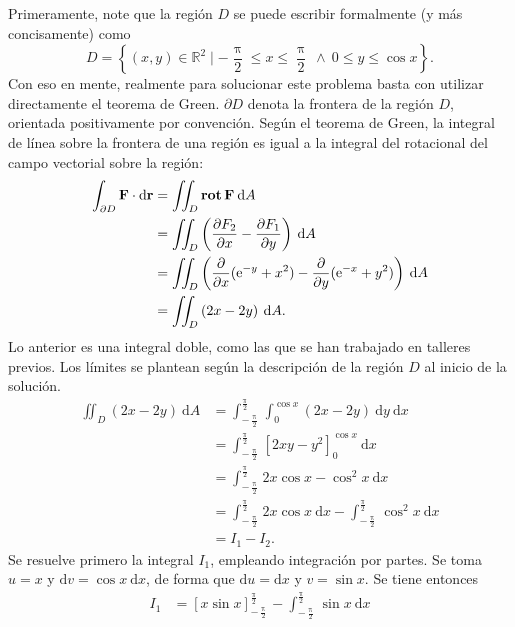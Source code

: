 \documentclass{fmbvecto}
\begin{document}
\begin{problema}
    Primeramente, note que la región \(D\) se puede escribir formalmente (y más concisamente) como
    \[
    D = \left\{ (x, y) \in \mathbb{R}^2 \mid -\frac{\uppi}{2} \leq x \leq \frac{\uppi}{2} \ \land \ 0 \leq y \leq \cos x \right\}.
    \]
    Con eso en mente, realmente para solucionar este problema basta con utilizar directamente el teorema de Green. \(\partial D\) denota la frontera de la región \(D\), orientada positivamente por convención. Según el teorema de Green, la integral de línea sobre la frontera de una región es igual a la integral del rotacional del campo vectorial sobre la región:
    \begin{align*}
        \int_{\partial D} \boldsymbol{{\mathbf{F}}} \cdot \mathrm{d}\boldsymbol{{\mathbf{r}}} &= \iint_D \operatorname{\mathbf{rot}} \boldsymbol{{\mathbf{F}}} \: \mathrm{d}A \\
        &= \iint_D \left( \frac{\partial F_2}{\partial x} - \frac{\partial F_1}{\partial y} \right) \: \mathrm{d}A \\
        &= \iint_D \left( \frac{\partial}{\partial x} (\mathrm{e}^{-y} + x^2) - \frac{\partial}{\partial y} (\mathrm{e}^{-x} + y^2) \right) \: \mathrm{d}A \\
        &= \iint_D \left( 2x - 2y \right) \: \mathrm{d}A.
    \end{align*}
    Lo anterior es una integral doble, como las que se han trabajado en talleres previos. Los límites se plantean según la descripción de la región \(D\) al inicio de la solución.
    \begin{align*}
        \iint_D \left( 2x - 2y \right) \: \mathrm{d}A &= \int_{-\frac{\uppi}{2}}^{\frac{\uppi}{2}} \int_0^{\cos x} \left( 2x - 2y \right) \: \mathrm{d}y \: \mathrm{d}x \\
        &= \int_{-\frac{\uppi}{2}}^{\frac{\uppi}{2}} \left[ 2xy - y^2 \right]_0^{\cos x} \: \mathrm{d}x \\
        &= \int_{-\frac{\uppi}{2}}^{\frac{\uppi}{2}} 2x \cos x - \cos^2 x \: \mathrm{d}x \\
        &= \int_{-\frac{\uppi}{2}}^{\frac{\uppi}{2}} 2x \cos x \: \mathrm{d}x - \int_{-\frac{\uppi}{2}}^{\frac{\uppi}{2}} \cos^2 x \: \mathrm{d}x \\
        &= I_1 - I_2.
    \end{align*}
    Se resuelve primero la integral \(I_1\), empleando integración por partes. Se toma \(u = x\) y \(\mathrm{d}v = \cos x \: \mathrm{d}x\), de forma que \(\mathrm{d}u = \mathrm{d}x\) y \(v = \sin x\). Se tiene entonces
    \begin{align*}
        I_1 &= \left[ x \sin x \right]_{-\frac{\uppi}{2}}^{\frac{\uppi}{2}} - \int_{-\frac{\uppi}{2}}^{\frac{\uppi}{2}} \sin x \: \mathrm{d}x \\

\end{align*}
\end{problema}
\end{document}
